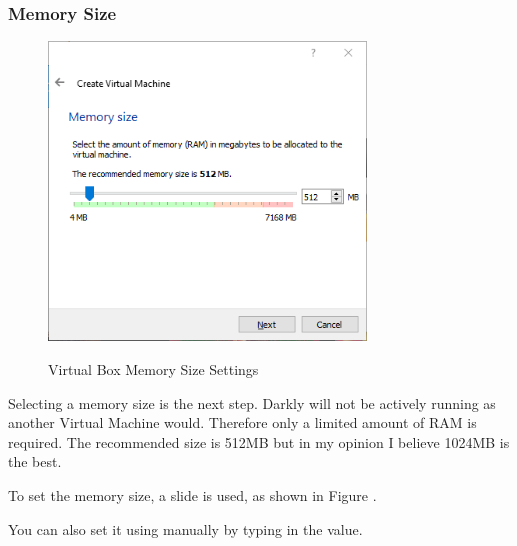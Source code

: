 \subsubsection{Memory Size}
\begin{figure}[!htb]
    \centering
    \includegraphics[width=0.752\textwidth]{images/Win00-02.png}\\[0cm]  
    \caption[Windows Virtual Box]{Virtual Box Memory Size Settings}
    \label{fig:00-03 - Windows Virtual Box Memory Size} 
\end{figure}
Selecting a memory size is the next step. Darkly will not be actively running
as another Virtual Machine would. Therefore only a limited amount of RAM is
required. The recommended size is 512MB but in my opinion I believe 1024MB is
the best.

To set the memory size, a slide is used, as shown in Figure .

You can also set it using manually by typing in the value.

